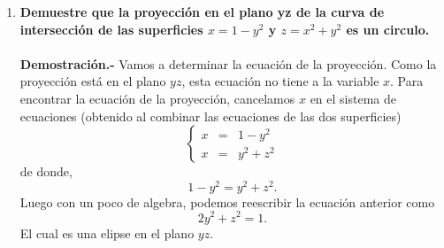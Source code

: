 
\begin{enumerate}

    \item \textbf{\boldmath Demuestre que la proyección en el plano yz de la curva de intersección de las superficies $x=1-y^2$ y $z=x^2+y^2$ es un circulo.\\\\
	Demostración.-}\; Vamos a determinar la ecuación de la proyección. Como la proyección está en el plano $yz$, esta ecuación no tiene a la variable $x$. Para encontrar la ecuación de la proyección, cancelamos $x$ en el sistema de ecuaciones (obtenido al combinar las ecuaciones de las dos superficies)
	$$
	    \left\{
		\begin{array}{rcl}
		    x&=&1-y^2\\
		    x&=&y^2+z^2
		\end{array}
	    \right.
	$$
	de donde, 
	$$1-y^2=y^2+z^2.$$
	Luego con un poco de algebra, podemos reescribir la ecuación anterior como
	$$2y^2+z^2=1.$$
	El cual es una elipse en el plano $yz.$\\\\
\end{enumerate}
